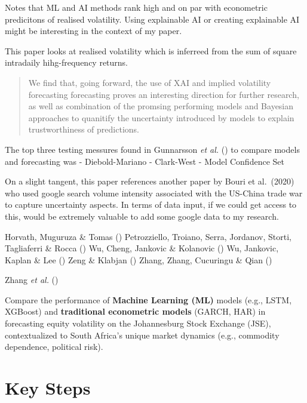 \documentclass[11pt,preprint]{elsarticle}
\numberwithin{equation}{section}
\numberwithin{figure}{section}
\numberwithin{table}{section}
\begin{document}
Notes that ML and AI methods rank high and on par with econometric
predicitons of realised volatility. Using explainable AI or creating
explainable AI might be interesting in the context of my paper.

This paper looks at realised volatility which is inferreed from the sum
of square intradaily hihg-frequency returns.

\begin{quote}
We find that, going forward, the use of XAI and implied volatility
forecasting forecasting proves an interesting direction for further
research, as well as combination of the promsing performing models and
Bayesian approaches to quanitify the uncertainty introduced by models to
explain trustworthiness of predictions.
\end{quote}

The top three testing messures found in Gunnarsson \emph{et al.}
() to compare models and
forecasting was - Diebold-Mariano - Clark-West - Model Confidence Set

On a slight tangent, this paper references another paper by Bouri et
al.~(2020) who used google search volume intensity associated with the
US-China trade war to capture uncertainty aspects. In terms of data
input, if we could get access to this, would be extremely valuable to
add some google data to my research.

Horvath, Muguruza \& Tomas ()
Petrozziello, Troiano, Serra, Jordanov, Storti, Tagliaferri \& Rocca
() Wu, Cheng, Jankovic \&
Kolanovic () Wu, Jankovic, Kaplan
\& Lee () Zeng \& Klabjan
() Zhang, Zhang, Cucuringu \& Qian
()

Zhang \emph{et al.} ()

Compare the performance of \textbf{Machine Learning (ML)} models (e.g.,
LSTM, XGBoost) and \textbf{traditional econometric models} (GARCH, HAR)
in forecasting equity volatility on the Johannesburg Stock Exchange
(JSE), contextualized to South Africa's unique market dynamics (e.g.,
commodity dependence, political risk).

\section{Key Steps}\label{key-steps}
\end{document}
